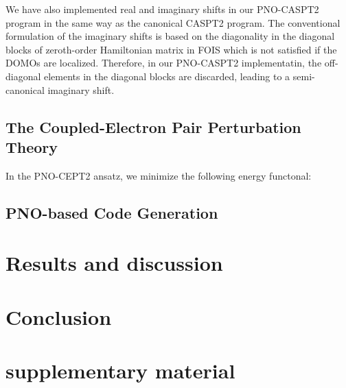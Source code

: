 \documentclass[aip,jcp,amsmath]{revtex4-1}
\begin{document}
%
We have also implemented real\cite{ROOS1995215} and imaginary\cite{FORSBERG1997196} shifts in our PNO-CASPT2 program in the same way as the canonical CASPT2 program.
%
The conventional formulation of the imaginary shifts is based on the diagonality in the diagonal blocks of zeroth-order Hamiltonian matrix in FOIS which is not satisfied if the DOMOs are localized.
%
Therefore, in our PNO-CASPT2 implementatin, the off-diagonal elements in the diagonal blocks are discarded, leading to a semi-canonical imaginary shift.

\subsection{The Coupled-Electron Pair Perturbation Theory}\label{Subsec:cept2}
%
In the PNO-CEPT2 ansatz, we minimize the following energy functonal:

%
\subsection{PNO-based Code Generation}

\section{Results and discussion}\label{Sec:results}

\section{Conclusion}\label{Sec:Conclusion}

\section*{supplementary material}

\begin{acknowledgments}  
  
\end{acknowledgments}


\end{document}
